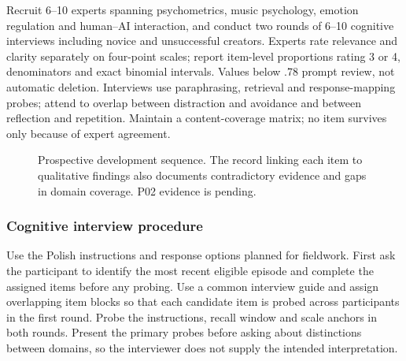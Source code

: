 Recruit 6--10 experts spanning psychometrics, music psychology, emotion regulation and human--AI interaction, and conduct two rounds of 6--10 cognitive interviews including novice and unsuccessful creators. Experts rate relevance and clarity separately on four-point scales; report item-level proportions rating 3 or 4, denominators and exact binomial intervals. Values below .78 prompt review, not automatic deletion. Interviews use paraphrasing, retrieval and response-mapping probes; attend to overlap between distraction and avoidance and between reflection and repetition. Maintain a content-coverage matrix; no item survives only because of expert agreement.

\begin{figure}[htbp]
\centering
{}
\caption{Prospective development sequence. The record linking each item to qualitative findings also documents contradictory evidence and gaps in domain coverage. P02 evidence is pending.}
\end{figure}

\subsubsection{Cognitive interview procedure}
Use the Polish instructions and response options planned for fieldwork. First ask the participant to identify the most recent eligible episode and complete the assigned items before any probing. Use a common interview guide and assign overlapping item blocks so that each candidate item is probed across participants in the first round. Probe the instructions, recall window and scale anchors in both rounds. Present the primary probes before asking about distinctions between domains, so the interviewer does not supply the intended interpretation.

